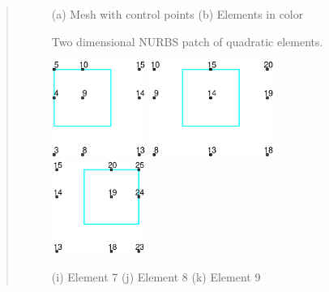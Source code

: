 \begin{quote}
\begin{figure}[!h]
\begin{center}
\centerline{(a) Mesh with control points \hspace{1in} (b) Elements in color}

\caption{Two dimensional NURBS patch of quadratic elements.  \label{fig5ex1}}
\end{center}
\end{figure}

\begin{figure}[!h]
\begin{center}

\centerline{
\includegraphics[width=1.2in]{figs/mesh_e7} \hspace{0.2in}
\includegraphics[width=1.6in]{figs/mesh_e8} \hspace{0.2in}
\includegraphics[width=1.2in]{figs/mesh_e9}
}

\centerline{(i) Element 7 \hspace{0.7in} (j) Element 8 \hspace{0.7in} (k) Element 9}


\end{center}
\end{figure}
\end{quote}
